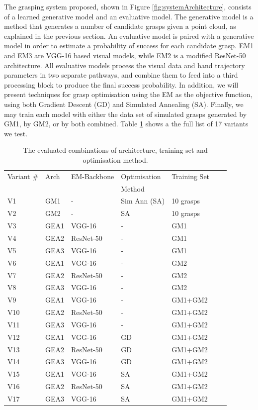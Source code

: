 The grasping system proposed, shown in Figure \ref{fig:systemArchitecture}, consists of a learned generative model and an evaluative model. The generative model is a method that generates a number of candidate grasps given a point cloud, as explained in the previous section. An evaluative model is paired with a generative model in order to estimate a probability of success for each candidate grasp. EM1 and EM3 are VGG-16 based visual models, while EM2 is a modified ResNet-50 architecture. All evaluative models process the visual data and hand trajectory parameters in two separate pathways, and combine them to feed into a third processing block to produce the final success probability. In addition, we will present techniques for grasp optimisation using the EM as the objective function, using both Gradient Descent (GD) and Simulated Annealing (SA). Finally, we may train each model with either the data set of simulated grasps generated by GM1, by GM2, or by both combined. Table \ref{table:GEBreakdown} shows a the full list of 17 variants we test.

\begin{table}[]
\centering
\begin{tabular}{|l|l|l|l|l|l|l|}
\hline
Variant \# & Arch  & EM-Backbone & Optimisation  & Training Set \\ 
 & & & Method & \\ \hline
V1 & GM1    & - & Sim Ann (SA) & 10 grasps  \\ \hline
V2 & GM2    & - & SA & 10 grasps  \\ \hline
V3 & GEA1 & VGG-16 & - & GM1 \\ \hline
V4 & GEA2 & ResNet-50 & - & GM1 \\ \hline
V5 & GEA3 & VGG-16 & - & GM1 \\ \hline
V6 & GEA1 & VGG-16 & - & GM2 \\ \hline
V7 & GEA2 & ResNet-50 & - & GM2 \\ \hline
V8 & GEA3 & VGG-16 & - & GM2 \\ \hline
V9 & GEA1 & VGG-16 & - & GM1+GM2 \\ \hline
V10 & GEA2 & ResNet-50 & - & GM1+GM2 \\ \hline
V11 & GEA3 & VGG-16 & - & GM1+GM2 \\ \hline
V12 & GEA1 & VGG-16 & GD & GM1+GM2 \\ \hline
V13 & GEA2 & ResNet-50 & GD & GM1+GM2 \\ \hline
V14 & GEA3 & VGG-16 & GD & GM1+GM2 \\ \hline
V15 & GEA1 & VGG-16 & SA & GM1+GM2 \\ \hline
V16 & GEA2 & ResNet-50 & SA & GM1+GM2 \\ \hline
V17 & GEA3 & VGG-16 & SA & GM1+GM2 \\ \hline
\end{tabular}
\caption{The evaluated combinations of architecture, training set and optimisation method.}
\label{table:GEBreakdown}
\end{table}

